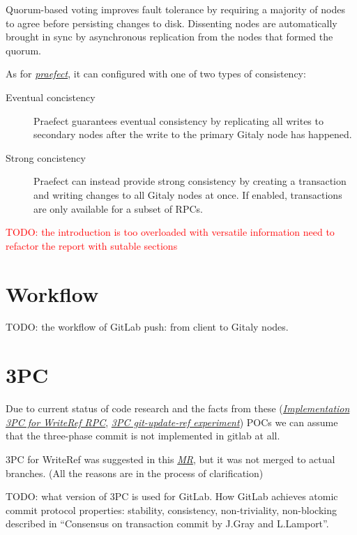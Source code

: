 \documentclass[acmlarge, screen, nonacm]{acmart}
\newcommand{\todo}[1]{\textcolor{red}{TODO: #1}}
\begin{document}
  Quorum-based voting improves fault tolerance by requiring a majority of nodes 
  to agree before persisting changes to disk. Dissenting nodes are automatically brought in sync by
   asynchronous replication from the nodes that formed the quorum.

  As for \emph{\href{https://gitlab.com/groups/gitlab-org/-/epics/1189}{praefect}}, it can configured with one of two types of consistency:
  \begin{description}
    \item[Eventual concistency]
    Praefect guarantees eventual consistency by replicating all writes 
    to secondary nodes after the write to the primary Gitaly node has happened.
    \item[Strong concistency]
    Praefect can instead provide strong consistency by creating a transaction and writing
     changes to all Gitaly nodes at once. If enabled, transactions are only available for a subset of RPCs. 
  \end{description}

  \todo{the introduction is too overloaded with versatile information need to refactor the report with sutable sections}
\section{Workflow}

TODO: the workflow of GitLab push: from client to Gitaly nodes.

\section{3PC}

Due to current status of code research and the facts from these 
(\emph{\href{https://gitlab.com/gitlab-org/gitaly/-/issues/2466}{Implementation 3PC for WriteRef RPC}},
\emph{\href{https://gitlab.com/gitlab-org/gitaly/-/issues/2529}{3PC git-update-ref experiment}})
POCs we can assume that the three-phase commit is not implemented in gitlab at all.

3PC for WriteRef was suggested in this
\emph{\href{https://gitlab.com/gitlab-org/gitaly/-/issues/2466}{MR}},
but it was not merged to actual branches. (All the reasons are in the process of clarification)

TODO: what version of 3PC is used for GitLab. How GitLab achieves atomic commit protocol properties:
stability, consistency, non-triviality, non-blocking described in
``Consensus on transaction commit by J.Gray and L.Lamport''.
\end{document}
